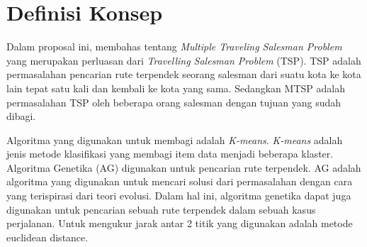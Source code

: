 \section{Definisi Konsep}

Dalam proposal ini, membahas tentang \textit{Multiple Traveling Salesman Problem} yang merupakan perluasan dari \textit{Travelling Salesman Problem} (TSP). TSP adalah permasalahan pencarian rute terpendek seorang salesman dari suatu kota ke kota lain tepat satu kali dan kembali ke kota yang sama. Sedangkan MTSP adalah permasalahan TSP oleh beberapa orang salesman dengan tujuan yang sudah dibagi.

Algoritma yang digunakan untuk membagi adalah \textit{K-means}. \textit{K-means} adalah jenis metode klasifikasi yang membagi item data menjadi beberapa klaster. Algoritma Genetika (AG) digunakan untuk pencarian rute terpendek. AG adalah algoritma yang digunakan untuk mencari solusi dari permasalahan dengan cara yang terispirasi dari teori evolusi. Dalam hal ini, algoritma genetika dapat juga digunakan untuk pencarian sebuah rute terpendek dalam sebuah kasus perjalanan. Untuk mengukur jarak antar 2 titik yang digunakan adalah metode euclidean distance.
